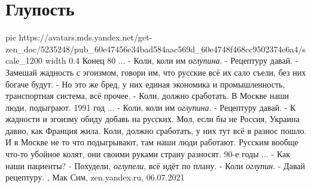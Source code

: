  
 
 
 
 
\chapter{Глупость}

\ifcmt
  pic https://avatars.mds.yandex.net/get-zen_doc/5235248/pub_60e47456e34bad584aac569d_60e4748f468cc9502374e6a4/scale_1200
	width 0.4
\fi
Конец 80 ...
- Коли, коли им \emph{оглупина}.
- Рецептуру давай.
- Замешай жадность с эгоизмом, говори им, что русские всё их сало съели, без них богаче будут.
- Но это же бред, у них единая экономика и промышленность, транспортная система, всё прочее.
- Коли, должно сработать. В Москве наши люди, подыграют.
1991 год ...
- Коли, коли им \emph{оглупина}.
- Рецептуру давай.
- К жадности и эгоизму обиду добавь на русских. Мол, если бы не Россия, Украина
давно, как Франция жила. Коли, должно сработать, у них тут всё в разнос пошло.
И в Москве не то что подыгрывают, там наши люди работают. Русским вообще что-то
убойное колят, они своими руками страну разносят.
90-е годы ...
- Как наши пациенты?
- Похудели, \emph{оглупели}, всё идёт по плану.
- Коли \emph{оглупин}.
- Давай рецептуру. 
, Мак Сим, zen.yandex.ru, 06.07.2021

